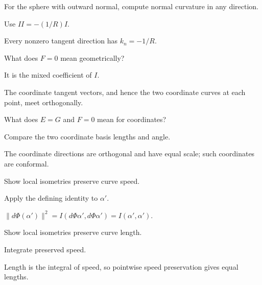 \begin{exercise}\label{exr:vii15-14}
For the sphere with outward normal, compute normal curvature in any direction.
\end{exercise}
\begin{hint}
Use \(II=-(1/R)I\).
\end{hint}
\begin{solution}
Every nonzero tangent direction has \(k_n=-1/R\).
\end{solution}

\begin{exercise}\label{exr:vii15-15}
What does \(F=0\) mean geometrically?
\end{exercise}
\begin{hint}
It is the mixed coefficient of \(I\).
\end{hint}
\begin{solution}
The coordinate tangent vectors, and hence the two coordinate curves at each point, meet orthogonally.
\end{solution}

\begin{exercise}\label{exr:vii15-16}
What does \(E=G\) and \(F=0\) mean for coordinates?
\end{exercise}
\begin{hint}
Compare the two coordinate basis lengths and angle.
\end{hint}
\begin{solution}
The coordinate directions are orthogonal and have equal scale; such coordinates are conformal.
\end{solution}

\begin{exercise}\label{exr:vii15-17}
Show local isometries preserve curve speed.
\end{exercise}
\begin{hint}
Apply the defining identity to \(\alpha'\).
\end{hint}
\begin{solution}
\(\|d\Phi(\alpha')\|^2=I(d\Phi\alpha',d\Phi\alpha')=I(\alpha',\alpha')\).
\end{solution}

\begin{exercise}\label{exr:vii15-18}
Show local isometries preserve curve length.
\end{exercise}
\begin{hint}
Integrate preserved speed.
\end{hint}
\begin{solution}
Length is the integral of speed, so pointwise speed preservation gives equal lengths.
\end{solution}

